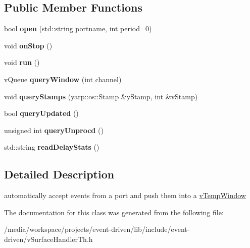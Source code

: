 \subsection*{Public Member Functions}
\begin{DoxyCompactItemize}
\item 
\mbox{\label{classev_1_1tWinThread_a1edd593d8901ca970a51bfeb09181234}} 
bool {\bfseries open} (std\+::string portname, int period=0)
\item 
\mbox{\label{classev_1_1tWinThread_ab12b04cd804ac7f6d2f6a199bb2078a8}} 
void {\bfseries on\+Stop} ()
\item 
\mbox{\label{classev_1_1tWinThread_a6992dcf7884d08d7296e4489ef264959}} 
void {\bfseries run} ()
\item 
\mbox{\label{classev_1_1tWinThread_a6937e3d587982b4ecbc8e776c89b5ea1}} 
v\+Queue {\bfseries query\+Window} (int channel)
\item 
\mbox{\label{classev_1_1tWinThread_a346e943bc1a1e06210deb6da26fa18f6}} 
void {\bfseries query\+Stamps} (yarp\+::os\+::\+Stamp \&y\+Stamp, int \&v\+Stamp)
\item 
\mbox{\label{classev_1_1tWinThread_a4121006bf6750fb8b5d2e2844479b39f}} 
bool {\bfseries query\+Updated} ()
\item 
\mbox{\label{classev_1_1tWinThread_ab3f171e6997f7e7e68abf536afa97c17}} 
unsigned int {\bfseries query\+Unprocd} ()
\item 
\mbox{\label{classev_1_1tWinThread_acb5f610d1fe4e6eef43cae31c0ea0f8e}} 
std\+::string {\bfseries read\+Delay\+Stats} ()
\end{DoxyCompactItemize}


\subsection{Detailed Description}
automatically accept events from a port and push them into a \hyperlink{classev_1_1vTempWindow}{v\+Temp\+Window} 

The documentation for this class was generated from the following file\+:\begin{DoxyCompactItemize}
\item 
/media/workspace/projects/event-\/driven/lib/include/event-\/driven/v\+Surface\+Handler\+Th.\+h\end{DoxyCompactItemize}
